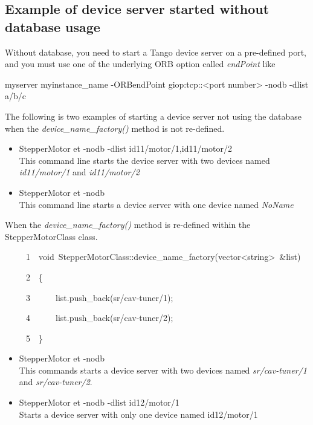 \subsection{Example of device server started without database usage}

Without database, you need to start a Tango device server on a pre-defined
port, and you must use one of the underlying ORB option
called \emph{endPoint} like \begin{center}myserver myinstance\_name
-ORBendPoint giop:tcp::<port number> -nodb -dlist a/b/c\end{center}

The following is two examples of starting a device server not using
the database when the \emph{device\_name\_factory()} method is not
re-defined.
\begin{itemize}
\item StepperMotor et -nodb -dlist id11/motor/1,id11/motor/2\\
This command line starts the device server with two devices named
\emph{id11/motor/1} and \emph{id11/motor/2}
\item StepperMotor et -nodb\\
This command line starts a device server with one device named \emph{NoName}
\end{itemize}
When the \emph{device\_name\_factory()} method is re-defined within
the StepperMotorClass class.


\begin{lyxcode}
~~~~~1~~void~StepperMotorClass::device\_name\_factory(vector<string>~\&list)

~~~~~2~~\{

~~~~~3~~~~~~list.push\_back(\textquotedbl{}sr/cav-tuner/1\textquotedbl{});

~~~~~4~~~~~~list.push\_back(\textquotedbl{}sr/cav-tuner/2\textquotedbl{});

~~~~~5~~\}
\end{lyxcode}

\begin{itemize}
\item StepperMotor et -nodb\\
This commands starts a device server with two devices named \emph{sr/cav-tuner/1}
and \emph{sr/cav-tuner/2}.
\item StepperMotor et -nodb -dlist id12/motor/1\\
Starts a device server with only one device named id12/motor/1
\end{itemize}

